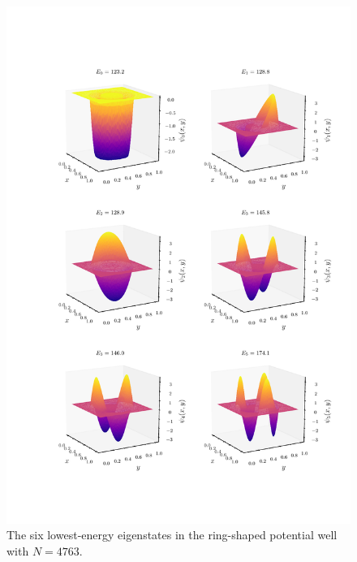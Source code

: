 \documentclass[a4paper,12pt]{article}
\begin{document}
\begin{figure}[H]
\centering
\vspace{-5cm}
\includegraphics[width=\textwidth]{../figs/eigenfuncs_circle.pdf}
\caption{The six lowest-energy eigenstates in the ring-shaped potential well with $N=4763$.}
\label{fig: circleEigFuncs}
\end{figure}
\end{document}
